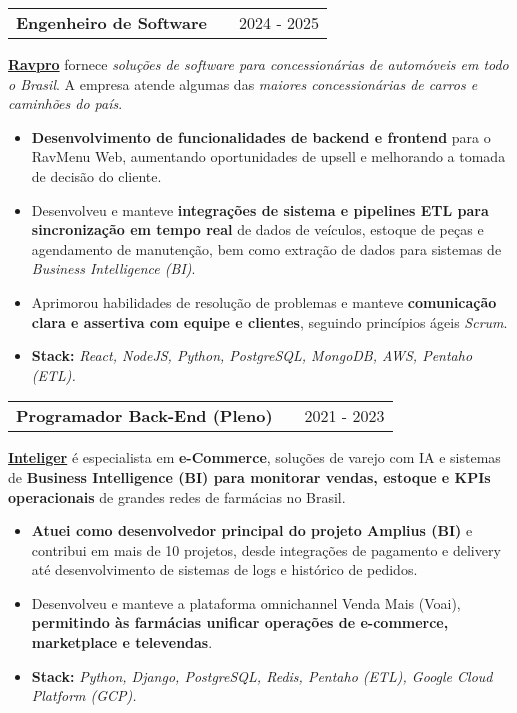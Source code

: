 \documentclass[a4paper,12pt]{article}
\makeatletter
\newenvironment{joblong}[2]
{
    \begin{tabularx}{\linewidth}{@{}l X r@{}}
        \textbf{#1} & \hfill & #2 \\[3.75pt]
    \end{tabularx}
    \begin{minipage}[t]{\linewidth}
    }
    {
    \end{minipage}
}
\newenvironment{bullets}
{
    \begin{itemize}[nosep,after=\strut, leftmargin=1em, itemsep=3pt,label=--]
    }
    {
    \end{itemize}
}
\makeatother
\begin{document}
    \begin{joblong}{Engenheiro de Software}{2024 - 2025}
        \href{https://ravpro.com.br}{\textbf{Ravpro}} fornece \textit{soluções de software para concessionárias de automóveis em todo o Brasil}. A empresa atende algumas das \textit{maiores concessionárias de carros e caminhões do país}.
        \begin{bullets}
            \item \textbf{Desenvolvimento de funcionalidades de backend e frontend} para o RavMenu Web, aumentando oportunidades de upsell e melhorando a tomada de decisão do cliente.
            \item Desenvolveu e manteve \textbf{integrações de sistema e pipelines ETL para sincronização em tempo real} de dados de veículos, estoque de peças e agendamento de manutenção, bem como extração de dados para sistemas de \textit{Business Intelligence (BI)}.
            \item Aprimorou habilidades de resolução de problemas e manteve \textbf{comunicação clara e assertiva com equipe e clientes}, seguindo princípios ágeis \textit{Scrum}.
            \item \textbf{Stack:} \textit{React, NodeJS, Python, PostgreSQL, MongoDB, AWS, Pentaho (ETL).}
        \end{bullets}
    \end{joblong}

    \begin{joblong}{Programador Back-End (Pleno)}{2021 - 2023}
        \href{https://inteliger.com.br}{\textbf{Inteliger}} é especialista em \textbf{e-Commerce}, soluções de varejo com IA e sistemas de \textbf{Business Intelligence (BI) para monitorar vendas, estoque e KPIs operacionais} de grandes redes de farmácias no Brasil.
        \begin{bullets}
            \item \textbf{Atuei como desenvolvedor principal do projeto Amplius (BI)} e contribui em mais de 10 projetos, desde integrações de pagamento e delivery até desenvolvimento de sistemas de logs e histórico de pedidos.
            \item Desenvolveu e manteve a plataforma omnichannel Venda Mais (Voai), \textbf{permitindo às farmácias unificar operações de e-commerce, marketplace e televendas}.
            \item \textbf{Stack:} \textit{Python, Django, PostgreSQL, Redis, Pentaho (ETL), Google Cloud Platform (GCP).}
        \end{bullets}
    \end{joblong}
\end{document}
